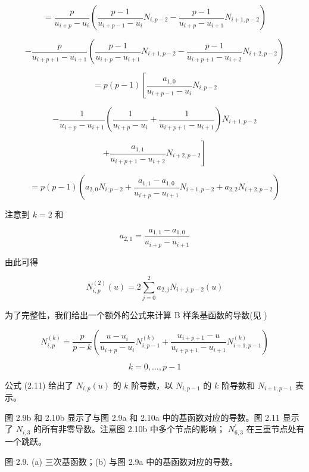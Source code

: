 \documentclass[../main.tex]{subfiles}
\begin{document}
\[
= \frac{p}{{u}_{i + p} - {u}_{i}}\left( {\frac{p - 1}{{u}_{i + p - 1} - {u}_{i}}{N}_{i,p - 2} - \frac{p - 1}{{u}_{i + p} - {u}_{i + 1}}{N}_{i + 1,p - 2}}\right)
\]

\[
- \frac{p}{{u}_{i + p + 1} - {u}_{i + 1}}\left( {\frac{p - 1}{{u}_{i + p} - {u}_{i + 1}}{N}_{i + 1,p - 2} - \frac{p - 1}{{u}_{i + p + 1} - {u}_{i + 2}}{N}_{i + 2,p - 2}}\right)
\]

\[
= p\left( {p - 1}\right) \left\lbrack  {\frac{{a}_{1,0}}{{u}_{i + p - 1} - {u}_{i}}{N}_{i,p - 2}}\right.
\]

\[
- \frac{1}{{u}_{i + p} - {u}_{i + 1}}\left( {\frac{1}{{u}_{i + p} - {u}_{i}} + \frac{1}{{u}_{i + p + 1} - {u}_{i + 1}}}\right) {N}_{i + 1,p - 2}
\]

\[
\left. {+\frac{{a}_{1,1}}{{u}_{i + p + 1} - {u}_{i + 2}}{N}_{i + 2,p - 2}}\right\rbrack
\]

\[
= p\left( {p - 1}\right) \left( {{a}_{2,0}{N}_{i,p - 2} + \frac{{a}_{1,1} - {a}_{1,0}}{{u}_{i + p} - {u}_{i + 1}}{N}_{i + 1,p - 2} + {a}_{2,2}{N}_{i + 2,p - 2}}\right)
\]

注意到 \(k = 2\) 和

\[
{a}_{2,1} = \frac{{a}_{1,1} - {a}_{1,0}}{{u}_{i + p} - {u}_{i + 1}}
\]

由此可得

\[
{N}_{i,p}^{\left( 2\right) }\left( u\right)  = 2\mathop{\sum }\limits_{{j = 0}}^{2}{a}_{2,j}{N}_{i + j,p - 2}\left( u\right)
\]

为了完整性，我们给出一个额外的公式来计算 B 样条基函数的导数(见 \cite{Butt76})

\[
{N}_{i,p}^{\left( k\right) } = \frac{p}{p - k}\left( {\frac{u - {u}_{i}}{{u}_{i + p} - {u}_{i}}{N}_{i,p - 1}^{\left( k\right) } + \frac{{u}_{i + p + 1} - u}{{u}_{i + p + 1} - {u}_{i + 1}}{N}_{i + 1,p - 1}^{\left( k\right) }}\right)
\]

\[
k = 0,\ldots ,p - 1 \tag{2.11}
\]

公式 (2.11) 给出了 \({N}_{i,p}\left( u\right)\) 的 \(k\) 阶导数，以 \({N}_{i,p - 1}\) 的 \(k\) 阶导数和 \({N}_{i + 1,p - 1}\) 表示。

图 2.9b 和 2.10b 显示了与图 2.9a 和 2.10a 中的基函数对应的导数。图 2.11 显示了 \({N}_{i,3}\) 的所有非零导数。注意图 2.10b 中多个节点的影响； \({N}_{6,3}^{\prime }\) 在三重节点处有一个跳跃。

\begin{center}
\begin{minipage}{18cm}
\vspace*{.6\baselineskip}
\centering
{}
\par\smallskip

图 2.9. (a) 三次基函数；(b) 与图 2.9a 中的基函数对应的导数。
\end{minipage}
\end{center}
\end{document}
